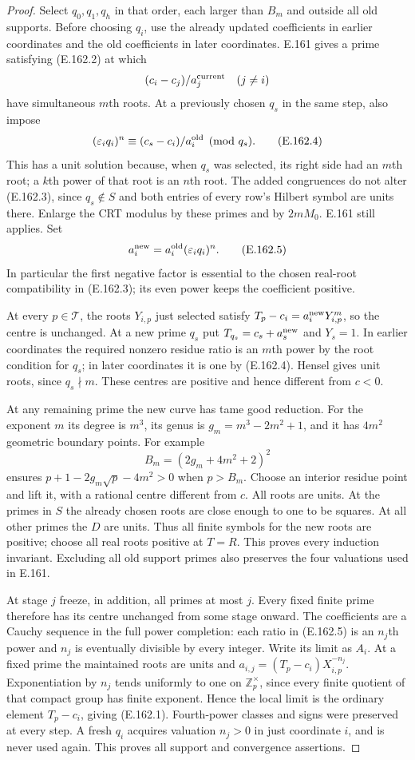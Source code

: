 \begin{proof}
Select $q_0,q_1,q_h$ in that order, each larger than $B_m$
and outside all old supports.  Before choosing $q_i$, use the
already updated coefficients in earlier coordinates and
the old coefficients in later coordinates.  E.161 gives a
prime satisfying (E.162.2) at which
\[
 (c_i-c_j)/a_j^{\rm current}\quad(j\ne i)
\]
have simultaneous $m$th roots.  At a previously chosen
$q_s$ in the same step, also impose
\[
 (\varepsilon_iq_i)^n\equiv
                 (c_s-c_i)/a_i^{\rm old}\pmod {q_s}.
\tag{E.162.4}
\]
This has a unit solution because, when $q_s$ was selected,
its right side had an $m$th root; a $k$th power of that root
is an $n$th root.  The added congruences do not alter
(E.162.3), since $q_s\notin S$ and both entries of every
row's Hilbert symbol are units there.  Enlarge the CRT
modulus by these primes and by $2mM_0$.  E.161 still applies.
Set
\[
 a_i^{\rm new}=a_i^{\rm old}(\varepsilon_iq_i)^n.
\tag{E.162.5}
\]
In particular the first negative factor is essential to
the chosen real-root compatibility in (E.162.3); its even
power keeps the coefficient positive.

At every $p\in\mathcal T$, the roots $Y_{i,p}$ just selected
satisfy $T_p-c_i=a_i^{\rm new}Y_{i,p}^{m}$, so the centre is
unchanged.  At a new prime $q_s$ put
$T_{q_s}=c_s+a_s^{\rm new}$ and $Y_s=1$.  In earlier
coordinates the required nonzero residue ratio is an
$m$th power by the root condition for $q_s$; in later
coordinates it is one by (E.162.4).  Hensel gives unit roots,
since $q_s\nmid m$.  These centres are positive and hence
different from $c<0$.

At any remaining prime the new curve has tame good reduction.
For the exponent $m$ its degree is $m^3$, its genus is
$g_m=m^3-2m^2+1$, and it has $4m^2$ geometric boundary points.
For example
\[
 B_m=(2g_m+4m^2+2)^2
\]
ensures $p+1-2g_m\sqrt p-4m^2>0$ when $p>B_m$.
Choose an interior residue point and lift it, with a rational
centre different from $c$.  All roots are units.  At the
primes in $S$ the already chosen roots are close enough to
one to be squares.  At all other primes the $D$ are units.
Thus all finite symbols for the new roots are positive;
choose all real roots positive at $T=R$.  This proves every
induction invariant.  Excluding all old support primes also
preserves the four valuations used in E.161.

At stage $j$ freeze, in addition, all primes at most $j$.
Every fixed finite prime therefore has its centre unchanged
from some stage onward.  The coefficients are a Cauchy
sequence in the full power completion: each ratio in
(E.162.5) is an $n_j$th power and $n_j$ is eventually divisible
by every integer.  Write its limit as $A_i$.  At a fixed
prime the maintained roots are units and
$a_{i,j}=(T_p-c_i)X_{i,p}^{-n_j}$.  Exponentiation by $n_j$
tends uniformly to one on $\mathbb Z_p^\times$, since every
finite quotient of that compact group has finite exponent.
Hence the local limit is the ordinary element $T_p-c_i$,
giving (E.162.1).  Fourth-power classes and signs were
preserved at every step.  A fresh $q_i$ acquires valuation
$n_j>0$ in just coordinate $i$, and is never used again.
This proves all support and convergence assertions.
\end{proof}

